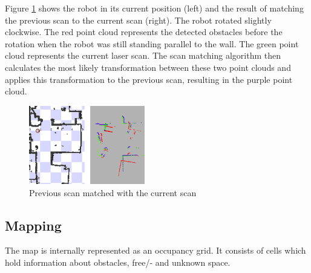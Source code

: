 \documentclass{ba-kecs}
\begin{document}
Figure \ref{fig:scanmatcher} shows the robot in its current position (left) and the result of matching the previous scan to the current scan (right). The robot rotated slightly clockwise. The red point cloud represents the detected obstacles before the rotation when the robot was still standing parallel to the wall. The green point cloud represents the current laser scan. The scan matching algorithm then calculates the most likely transformation between these two point clouds and applies this transformation to the previous scan, resulting in the purple point cloud.

\begin{figure}[htbp]
	\centering
		\includegraphics[width=0.45\textwidth]{figures/Scanmatch.jpg}
	\caption{Previous scan matched with the current scan}
	\label{fig:scanmatcher}
\end{figure}

\subsection{Mapping}
\label{sec:mapping}
The map is internally represented as an occupancy grid. It consists of cells which hold information about obstacles, free/- and unknown space. 
\end{document}
